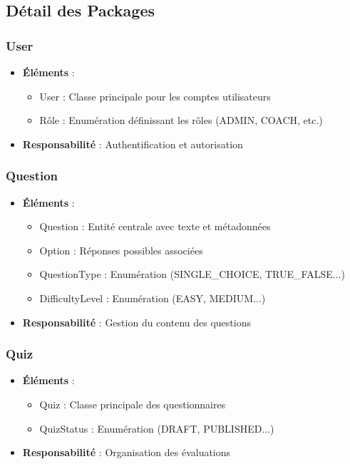\documentclass[12pt,a4paper]{report}
\begin{document}
\subsection{Détail des Packages}

\subsubsection{User}
\begin{itemize}
\item \textbf{Éléments} :
  \begin{itemize}
  \item User : Classe principale pour les comptes utilisateurs
  \item Rôle : Enumération définissant les rôles (ADMIN, COACH, etc.)
  \end{itemize}
\item \textbf{Responsabilité} : Authentification et autorisation
\end{itemize}

\subsubsection{Question}
\begin{itemize}
\item \textbf{Éléments} :
  \begin{itemize}
  \item Question : Entité centrale avec texte et métadonnées
  \item Option : Réponses possibles associées
  \item QuestionType : Enumération (SINGLE\_CHOICE, TRUE\_FALSE...)
  \item DifficultyLevel : Enumération (EASY, MEDIUM...)
  \end{itemize}
\item \textbf{Responsabilité} : Gestion du contenu des questions
\end{itemize}

\subsubsection{Quiz}
\begin{itemize}
\item \textbf{Éléments} :
  \begin{itemize}
  \item Quiz : Classe principale des questionnaires
  \item QuizStatus : Enumération (DRAFT, PUBLISHED...)
  \end{itemize}
\item \textbf{Responsabilité} : Organisation des évaluations
\end{itemize}
\end{document}
